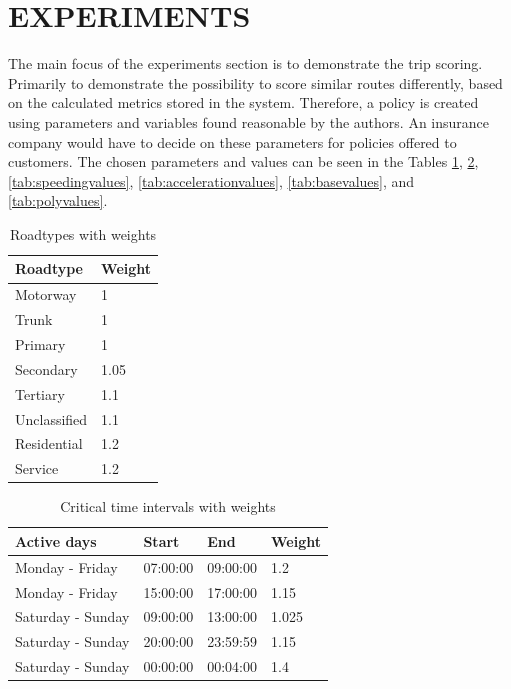 \section{EXPERIMENTS}\label{sec:expe}
The main focus of the experiments section is to demonstrate the trip scoring. Primarily to demonstrate the possibility to score similar routes differently, based on the calculated metrics stored in the system. Therefore, a policy is created using parameters and variables found reasonable by the authors. An insurance company would have to decide on these parameters for policies offered to customers. The chosen parameters and values can be seen in the Tables \ref{tab:roadtypevalues}, \ref{tab:crittimevalues}, \ref{tab:speedingvalues}, \ref{tab:accelerationvalues}, \ref{tab:basevalues}, and \ref{tab:polyvalues}.

\begin{table}
    \centering
    \begin{tabular}{ll}
    \textbf{Roadtype} & \textbf{Weight} \\ \hline
    Motorway          & 1               \\
    Trunk             & 1               \\
    Primary           & 1               \\
    Secondary         & 1.05            \\
    Tertiary          & 1.1             \\
    Unclassified      & 1.1             \\
    Residential       & 1.2             \\
    Service           & 1.2             \\ \hline
    \end{tabular}
    \caption{Roadtypes with weights}
    \label{tab:roadtypevalues}
\end{table}

\begin{table}
    \centering
    \begin{tabular}{llll}
    \textbf{Active days} & \textbf{Start} & \textbf{End} & \textbf{Weight} \\ \hline
    Monday - Friday      & 07:00:00       & 09:00:00     & 1.2             \\
    Monday - Friday      & 15:00:00       & 17:00:00     & 1.15            \\
    Saturday - Sunday    & 09:00:00       & 13:00:00     & 1.025           \\
    Saturday - Sunday    & 20:00:00       & 23:59:59     & 1.15            \\
    Saturday - Sunday    & 00:00:00       & 00:04:00     & 1.4             \\ \hline
    \end{tabular}
    \caption{Critical time intervals with weights}
    \label{tab:crittimevalues}
\end{table}

